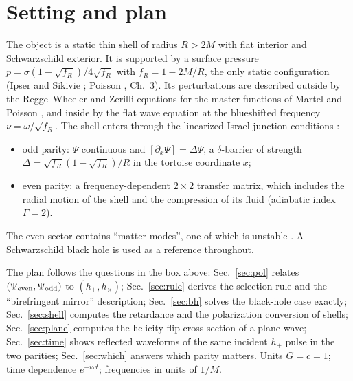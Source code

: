 \documentclass[11pt,a4paper]{article}
\numberwithin{equation}{section}
\newcommand{\sq}{\sqrt{f_R}}
\begin{document}
\tableofcontents
\newpage

\section{Setting and plan}\label{sec:intro}
The object is a static thin shell of radius $R>2M$ with flat interior and Schwarzschild exterior. It is supported by a
surface pressure $p=\sigma(1-\sq)/4\sq$ with $f_R=1-2M/R$, the only static configuration (Ipser and Sikivie
\cite{IS84}; Poisson \cite{Poisson04}, Ch.~3). Its perturbations are described outside by the Regge--Wheeler \cite{RW57} and
Zerilli \cite{Zerilli70} equations for the master functions of Martel and Poisson \cite{MP05}, and inside by the flat
wave equation at the blueshifted frequency $\nu=\omega/\sq$. The shell enters through the linearized Israel junction
conditions \cite{Israel66}:
\begin{itemize}
\item odd parity: $\Psi$ continuous and $[\partial_x\Psi]=\Delta\Psi$, a $\delta$-barrier of strength $\Delta=\sq(1-\sq)/R$ in the
tortoise coordinate $x$;
\item even parity: a frequency-dependent $2\times2$ transfer matrix, which includes the radial motion of the shell and the
compression of its fluid (adiabatic index $\Gamma=2$).
\end{itemize}
The even sector contains ``matter modes'', one of which is unstable \cite{PSP26}. A Schwarzschild black hole
\cite{Vishveshwara70,Chandrasekhar83} is used as a reference throughout.

The plan follows the questions in the box above:
Sec.~\ref{sec:pol} relates $(\Psi_{\rm even},\Psi_{\rm odd})$ to $(h_+,h_\times)$;
Sec.~\ref{sec:rule} derives the selection rule and the ``birefringent mirror'' description;
Sec.~\ref{sec:bh} solves the black-hole case exactly;
Sec.~\ref{sec:shell} computes the retardance and the polarization conversion of shells;
Sec.~\ref{sec:plane} computes the helicity-flip cross section of a plane wave;
Sec.~\ref{sec:time} shows reflected waveforms of the same incident $h_+$ pulse in the two parities;
Sec.~\ref{sec:which} answers which parity matters.
Units $G=c=1$; time dependence $e^{-i\omega t}$; frequencies in units of $1/M$.







\end{document}
